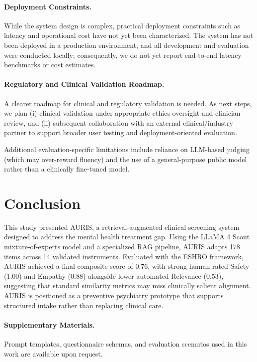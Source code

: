 \documentclass{svproc}
\begin{document}
\paragraph{Deployment Constraints.} While the system design is complex, practical deployment constraints such as latency and operational cost have not yet been characterized. The system has not been deployed in a production environment, and all development and evaluation were conducted locally; consequently, we do not yet report end-to-end latency benchmarks or cost estimates.

\paragraph{Regulatory and Clinical Validation Roadmap.} A clearer roadmap for clinical and regulatory validation is needed. As next steps, we plan (i) clinical validation under appropriate ethics oversight and clinician review, and (ii) subsequent collaboration with an external clinical/industry partner to support broader user testing and deployment-oriented evaluation.

Additional evaluation-specific limitations include reliance on LLM-based judging (which may over-reward fluency) and the use of a general-purpose public model rather than a clinically fine-tuned model.

\section{Conclusion}
This study presented AURIS, a retrieval-augmented clinical screening system designed to address the mental health treatment gap. Using the LLaMA 4 Scout mixture-of-experts model and a specialized RAG pipeline, AURIS adapts 178 items across 14 validated instruments. Evaluated with the ESHRO framework, AURIS achieved a final composite score of 0.76, with strong human-rated Safety (1.00) and Empathy (0.88) alongside lower automated Relevance (0.53), suggesting that standard similarity metrics may miss clinically salient alignment. AURIS is positioned as a preventive psychiatry prototype that supports structured intake rather than replacing clinical care.

\paragraph{Supplementary Materials.} Prompt templates, questionnaire schemas, and evaluation scenarios used in this work are available upon request.
\end{document}
